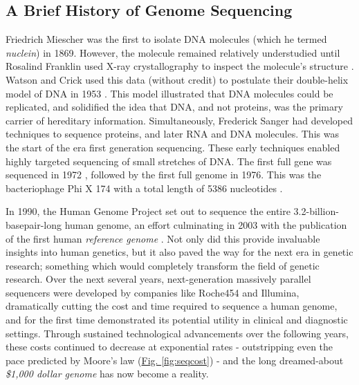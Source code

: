 \subsection{A Brief History of Genome Sequencing}
Friedrich Miescher was the first to isolate DNA molecules (which he termed \emph{nuclein}) in 1869. However, the molecule remained relatively understudied until Rosalind Franklin used X-ray crystallography to inspect the molecule's structure \cite{elkin2003rosalind}. Watson and Crick used this data (without credit) to postulate their double-helix model of DNA in 1953 \cite{watson1953molecular}. This model illustrated that DNA molecules could be replicated, and solidified the idea that DNA, and not proteins, was the primary carrier of hereditary information. Simultaneously, Frederick Sanger had developed techniques to sequence proteins, and later RNA and DNA molecules. This was the start of the era first generation sequencing. These early techniques enabled highly targeted sequencing of small stretches of DNA. The first full gene was sequenced in 1972 \cite{TODO}, followed by the first full genome in 1976. This was the bacteriophage Phi X 174 with a total length of 5386 nucleotides \cite{}.


In 1990, the Human Genome Project \cite{olson1993human} set out to sequence the entire 3.2-billion-basepair-long human genome, an effort culminating in 2003 with the publication of the first human \textit{reference genome} \cite{international2004finishing}. Not only did this provide invaluable insights into human genetics, but it also paved the way for the next era in genetic research; something which would completely transform the field of genetic research. Over the next several years, next-generation massively parallel sequencers were developed by companies like Roche454 and Illumina, dramatically cutting the cost and time required to sequence a human genome, and for the first time demonstrated its potential utility in clinical and diagnostic settings. Through sustained technological advancements over the following years, these costs continued to decrease at exponential rates - outstripping even the pace predicted by Moore's law (\hyperref[fig:seqcost]{Fig. \ref{fig:seqcost}}) - and the long dreamed-about \textit{\$1,000 dollar genome} \cite{thousanddollargenome} \cite{sequencingcostsNHGRI} has now become a reality.

